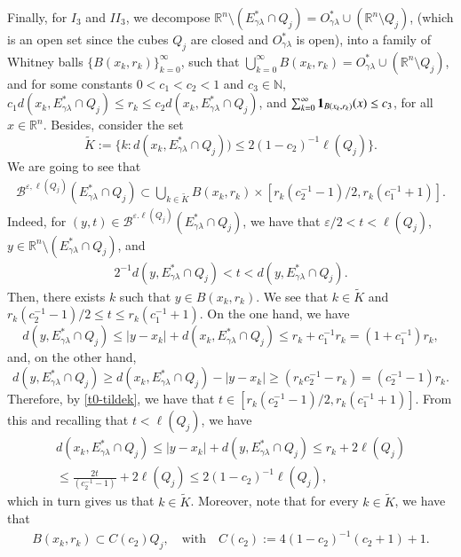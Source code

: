 \documentclass[11pt, a4paper,leqno]{amsart}
\renewcommand{\chi}{{\bf 1}}
\theoremstyle{plain}
\theoremstyle{definition}
\theoremstyle{remark}
\numberwithin{equation}{section}
\def \R{ \mathbb{R} }
\def \N{ \mathbb{N} }
\begin{document}
Finally, for $I_3$ and $II_3$, we decompose $\mathbb{R}^n\setminus (E_{\gamma\lambda}^*\cap Q_j)=O^*_{\gamma\lambda}\cup (\mathbb{R}^n\setminus Q_j)$, (which is an open set since the cubes $Q_j$ are closed and $O^*_{\gamma\lambda}$ is open), into a family of Whitney balls $\{B(x_k,r_k)\}_{k=0}^{\infty}$, such that $\bigcup_{k=0}^{\infty}B(x_k,r_k)=O^*_{\gamma\lambda}\cup (\R^n\setminus Q_j)$, and for some constants
$0<c_1<c_2<1$ and $c_3\in \N$, $c_1d(x_k,E^*_{\gamma\lambda}\cap Q_j)\leq r_k\leq c_2
d(x_k,E^*_{\gamma\lambda}\cap Q_j)$, and $\sum_{k=0}^{\infty}\chi_{B(x_k,r_k)}(x)\leq c_3$, for all $x\in \R^n$. Besides, consider the set
$$
\widetilde{K}:=\{k : d(x_k, E_{\gamma\lambda}^*\cap Q_j))\leq 2(1-c_2)^{-1}\ell(Q_j)\}.
$$
We are going to see that
\begin{align}\label{claim:II3}
\mathcal{B}^{\varepsilon,\ell(Q_j)}(E^*_{\gamma\lambda}\cap Q_j)\subset \bigcup_{k\in \widetilde{K}}B(x_k,r_k)\times [r_k(c_2^{-1}-1)/2,r_k(c_1^{-1}+1)].
\end{align}
Indeed, for $(y,t)\in \mathcal{B}^{\varepsilon.\ell(Q_j)}(E^*_{\gamma\lambda}\cap Q_j)$, we have that $\varepsilon/2<t<\ell(Q_j)$, $y\in \mathbb{R}^n\setminus (E^*_{\gamma\lambda}\cap Q_j)$, and
\begin{align}\label{t0-tildek}
2^{-1}d(y,E^*_{\gamma\lambda}\cap Q_j)< t< d(y,E^*_{\gamma\lambda}\cap Q_j).
\end{align}
Then, there exists $k$ such that $y\in B(x_k,r_k)$. We see that $k\in \widetilde{K}$ and $r_k(c_2^{-1}-1)/2\leq t\leq r_k(c_1^{-1}+1)$.
On the one hand, we have
$$
d(y,E^*_{\gamma\lambda}\cap Q_j)\leq |y-x_k|+d(x_k,E^*_{\gamma\lambda}\cap Q_j)\leq r_k+c_1^{-1}r_k=(1+c_1^{-1})r_k,
$$
and, on the other hand,
$$
d(y,E^*_{\gamma\lambda}\cap Q_j)\geq d(x_k,E^*_{\gamma\lambda}\cap Q_j)-|y-x_k|\geq (r_kc_2^{-1}-r_k)=(c_2^{-1}-1)r_k.
$$
Therefore, by \eqref{t0-tildek}, we have that $t\in [r_k(c_2^{-1}-1)/2,r_k(c_1^{-1}+1)]$. 
From this and recalling that $t<\ell(Q_j)$, we have
\begin{multline*}
d(x_k,E^*_{\gamma\lambda}\cap Q_j)\leq |y-x_k|+d(y,E^*_{\gamma\lambda}\cap Q_j)\leq r_k+2\ell(Q_j)
\\
\leq
\frac{2t}{(c_2^{-1}-1)}+2\ell(Q_j)
\leq 2(1-c_2)^{-1}\ell(Q_j),
\end{multline*}
which in turn gives us that $k\in \widetilde{K}$.
Moreover, note that for every $k\in \widetilde{K}$, we have that
\begin{align}\label{Bsubsetkinktilde}
B(x_k,r_k)\subset C(c_2)Q_j,\quad \textrm{with}\quad C(c_2):=4(1-c_2)^{-1}(c_2+1)+1.
\end{align}
\end{document}
